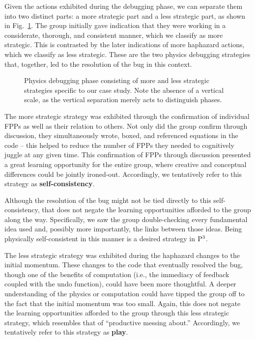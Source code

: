 \documentclass{msuphddissertation}
\begin{document}
\begin{doublespace}
Given the actions exhibited during the debugging phase, we can separate them into two distinct parts: a more strategic part and a less strategic part, as shown in Fig.~\ref{strategy}.  The group initially gave indication that they were working in a considerate, thorough, and consistent manner, which we classify as more strategic.  This is contrasted by the later indications of more haphazard actions, which we classify as less strategic.  These are the two physics debugging strategies that, together, led to the resolution of the bug in this context.

\begin{figure}
\caption{Physics debugging phase consisting of more and less strategic strategies specific to our case study.  Note the absence of a vertical scale, as the vertical separation merely acts to distinguish phases.}
\label{strategy}
\end{figure}

The more strategic strategy was exhibited through the confirmation of individual FPPs as well as their relation to others.  Not only did the group confirm through discussion, they simultaneously wrote, boxed, and referenced equations in the code -- this helped to reduce the number of FPPs they needed to cognitively juggle at any given time.\cite{Redish2003}  This confirmation of FPPs through discussion presented a great learning opportunity for the entire group, where creative and conceptual differences could be jointly ironed-out.  Accordingly, we tentatively refer to this strategy as \textbf{self-consistency}.

Although the resolution of the bug might not be tied directly to this self-consistency, that does not negate the learning opportunities afforded to the group along the way.  Specifically, we saw the group double-checking every fundamental idea used and, possibly more importantly, the links between those ideas.  Being physically self-consistent in this manner is a desired strategy in ${\rm P}^{3}$.

The less strategic strategy was exhibited during the haphazard changes to the initial momentum.  These changes to the code that eventually resolved the bug, though one of the benefits of computation (i.e., the immediacy of feedback coupled with the undo function), could have been more thoughtful.  A deeper understanding of the physics or computation could have tipped the group off to the fact that the initial momentum was too small.  Again, this does not negate the learning opportunities afforded to the group through this less strategic strategy, which resembles that of ``productive messing about.''\cite{Podolefsky2012}  Accordingly, we tentatively refer to this strategy as \textbf{play}.


\end{doublespace}
\end{document}
